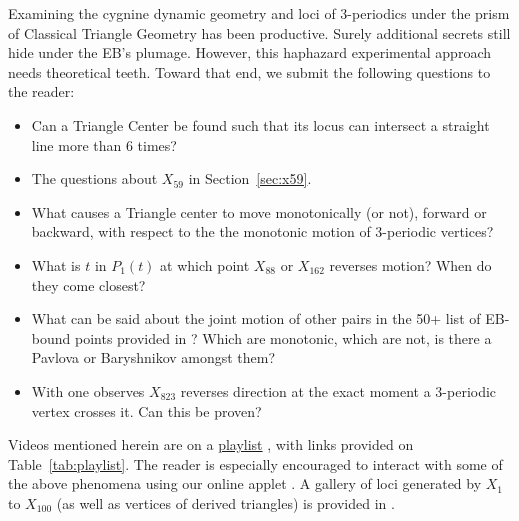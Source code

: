 Examining the cygnine dynamic geometry and loci of 3-periodics under the prism of Classical Triangle Geometry has been productive. Surely additional secrets still hide under the EB's plumage. However, this haphazard experimental approach needs theoretical teeth. Toward that end, we submit the following questions to the reader:

\begin{itemize}
    \item Can a Triangle Center be found such that its locus can intersect a straight line more than 6 times?
    \item The questions about $X_{59}$ in Section~\ref{sec:x59}.
    \item What causes a Triangle center to move monotonically (or not), forward or backward, with respect to the the monotonic motion of 3-periodic vertices?
    \item What is $t$ in $P_1(t)$ at which point $X_{88}$ or $X_{162}$ reverses motion? When do they come closest?
    \item What can be said about the joint motion of other pairs in the 50+ list of EB-bound points provided in \cite[X(9)]{etc}? Which are monotonic, which are not, is there a Pavlova or Baryshnikov amongst them?
    \item With \cite{reznik2019-applet} one observes $X_{823}$ reverses direction at the exact moment a 3-periodic vertex crosses it. Can this be proven?
\end{itemize}

Videos mentioned herein are on a \href{https://bit.ly/2vvJ9hW}{playlist} \cite{reznik2020-playlist-intriguing}, with links provided on Table~\ref{tab:playlist}. The reader is especially encouraged to interact with some of the above phenomena using our online applet \cite{reznik2019-applet}. A gallery of loci generated by $X_1$ to $X_{100}$ (as well as vertices of derived triangles) is provided in \cite{reznik2019-loci-gallery-all-derived-tris}. 

